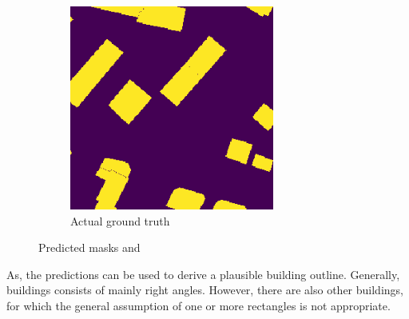 \begin{figure}[H]
\begin{subfigure}{0.4\textwidth}
    	\includegraphics[width=0.9\linewidth]{chapters/challenges/images/predicted_masks_gt.png}		    \caption{Actual ground truth}
    	\label{fig:challenges:predicted_building_masks_gt}
	\end{subfigure}
	\caption{Predicted masks and }
	\label{fig:challenges:building_masks}
\end{figure}


As, the predictions can be used to derive a plausible building outline. Generally, buildings consists of mainly right angles. However, there are also other buildings, for which the general assumption of one or more rectangles is not appropriate.


